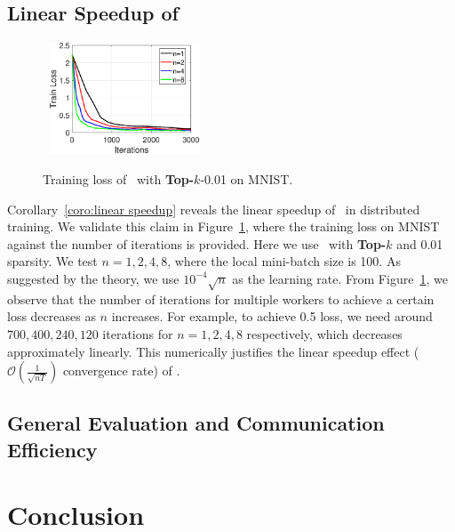 \documentclass[11pt]{article}
\begin{document}
\subsection{Linear Speedup of \algo}

\begin{figure}
  \vspace{-0.35in}
  \begin{center}
   \mbox{\hspace{-0.05in}
    \includegraphics[width=0.4\textwidth]{fig/linear_speedup.eps}}
  \end{center}
  \vspace{-0.1in}
  \caption{Training loss of \algo\ with \textbf{Top-$k$}-0.01 on MNIST.}
  \label{fig:speedup}
\end{figure}

Corollary~\ref{coro:linear speedup} reveals the linear speedup of \algo\ in distributed training. We validate this claim in Figure~\ref{fig:speedup}, where the training loss on MNIST against the number of iterations is provided. Here we use \algo\ with \textbf{Top-$k$} and 0.01 sparsity. We test $n=1,2,4,8$, where the local mini-batch size is 100. As suggested by the theory, we use $10^{-4}\sqrt n$ as the learning rate. From Figure~\ref{fig:speedup}, we observe that the number of iterations for multiple workers to achieve a certain loss decreases as $n$ increases. For example, to achieve 0.5 loss, we need around $700,400,240,120$ iterations for $n=1,2,4,8$ respectively, which decreases approximately linearly. This numerically justifies the linear speedup effect ($\mathcal O(\frac{1}{\sqrt{nT}})$ convergence rate) of \algo.

\subsection{General Evaluation and Communication Efficiency}


\section{Conclusion}\label{sec:conclusion}
\end{document}
